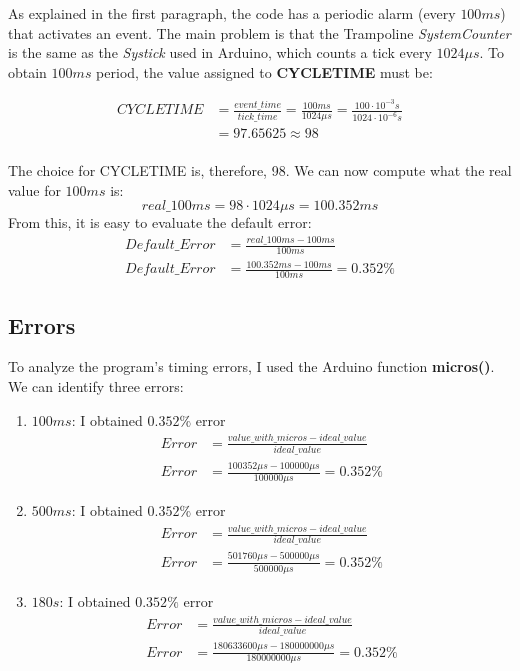 \documentclass[a4paper]{article}
\begin{document}
As explained in the first paragraph, the code has a periodic alarm (every \(100ms\)) that activates an event. The main problem is that the Trampoline \emph{SystemCounter} is the same as the \emph{Systick} used in Arduino, which counts a tick every \(1024 \mu s\). To obtain \(100ms\) period, the value assigned to  \textbf{CYCLETIME} must be:



\begin{align*}
  CYCLETIME & = \frac{event\_time}{tick\_time} = \frac{100ms}{1024\mu s} = \frac{100 \cdot 10^{-3} s}{1024 \cdot 10^{-6} s} \\[1ex]
            & = 97.65625 \approx 98
\end{align*} \\
The choice for CYCLETIME is, therefore, 98. We can now compute what the real value for \(100ms\) is:
\begin{equation*}
  real\_100ms = 98 \cdot 1024\mu s = 100.352ms
\end{equation*}
From this, it is easy to evaluate the default error:
\begin{align}
  Default\_Error & = \frac{real\_100ms - 100ms}{100ms}                  \label{Default_Error1} \\[1ex]
  Default\_Error & = \frac{100.352ms - 100ms}{100ms} = 0.352\%    \label{Default_Error2}
\end{align}

\newpage

\subsection{Errors}
To analyze the program's timing errors, I used the Arduino function \textbf{micros()}. We can identify three errors:
\begin{enumerate}
  \item \(100ms\): I obtained \(0.352\%\) error
        \begin{align*}
          Error & = \frac{value\_with\_micros - ideal\_value}{ideal\_value} \\[1ex]
          Error & = \frac{100352\mu s - 100000\mu s}{100000\mu s} = 0.352\%
        \end{align*}
  \item \(500ms\): I obtained \(0.352\%\) error
        \begin{align*}
          Error & = \frac{value\_with\_micros - ideal\_value}{ideal\_value} \\[1ex]
          Error & = \frac{501760\mu s - 500000\mu s}{500000\mu s} = 0.352\%
        \end{align*}
  \item \(180s\): I obtained \(0.352\%\) error
        \begin{align*}
          Error & = \frac{value\_with\_micros - ideal\_value}{ideal\_value}          \\[1ex]
          Error & = \frac{180633600\mu s - 180000000\mu s}{180000000\mu s} = 0.352\%
        \end{align*}
\end{enumerate}
\end{document}
